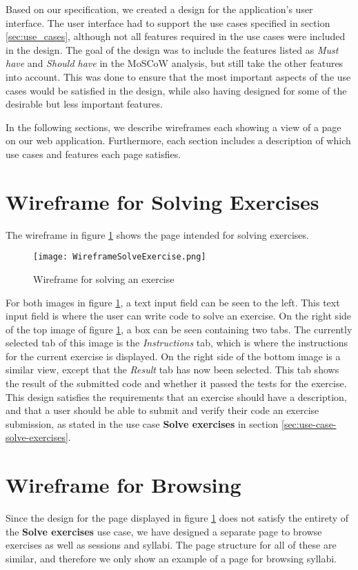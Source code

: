 Based on our specification, we created a design for the application's user interface. The user interface had to support the use cases specified in section \ref*{sec:use_cases}, although not all features required in the use cases were included in the design. The goal of the design was to include the features listed as \textit{Must have} and \textit{Should have} in the MoSCoW analysis, but still take the other features into account. This was done to ensure that the most important aspects of the use cases would be satisfied in the design, while also having designed for some of the desirable but less important features.

In the following sections, we describe wireframes each showing a view of a page on our web application. Furthermore, each section includes a description of which use cases and features each page satisfies.

\section{Wireframe for Solving Exercises}
The wireframe in figure \ref{fig:wfExercise} shows the page intended for solving exercises.
\begin{figure}[H]
	\texttt{[image: WireframeSolveExercise.png]}
	\centering
	\caption{Wireframe for solving an exercise}
	\label{fig:wfExercise}
\end{figure}

For both images in figure \ref{fig:wfExercise}, a text input field can be seen to the left. This text input field is where the user can write code to solve an exercise. On the right side of the top image of figure \ref{fig:wfExercise}, a box can be seen containing two tabs. The currently selected tab of this image is the \textit{Instructions} tab, which is where the instructions for the current exercise is displayed. On the right side of the bottom image is a similar view, except that the \textit{Result} tab has now been selected. This tab shows the result of the submitted code and whether it passed the tests for the exercise. This design satisfies the requirements that an exercise should have a description, and that a user should be able to submit and verify their code an exercise submission, as stated in the use case \textbf{Solve exercises} in section \ref{sec:use-case-solve-exercises}.

\section{Wireframe for Browsing}
Since the design for the page displayed in figure \ref{fig:wfExercise} does not satisfy the entirety of the \textbf{Solve exercises} use case, we have designed a separate page to browse exercises as well as sessions and syllabi. The page structure for all of these are similar, and therefore we only show an example of a page for browsing syllabi.

